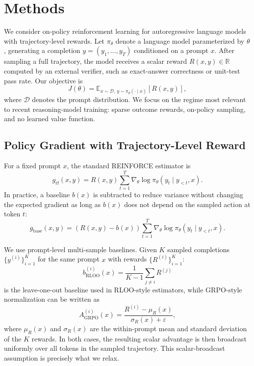 \section{Methods}\label{sec:methods}

We consider on-policy reinforcement learning for autoregressive language models with
trajectory-level rewards. Let $\pi_\theta$ denote a language model parameterized by
$\theta$, generating a completion $y=(y_1,\dots,y_T)$ conditioned on a prompt $x$. After
sampling a full trajectory, the model receives a scalar reward $R(x,y)\in\mathbb{R}$
computed by an external verifier, such as exact-answer correctness or unit-test pass
rate. Our objective is
\begin{equation}
J(\theta)=\mathbb{E}_{x \sim \mathcal{D},\, y \sim \pi_\theta(\cdot \mid x)}[R(x,y)],
\end{equation}
where $\mathcal{D}$ denotes the prompt distribution. We focus on the regime most
relevant to recent reasoning-model training: sparse outcome rewards, on-policy sampling,
and no learned value function.

\subsection{Policy Gradient with Trajectory-Level Reward}

For a fixed prompt $x$, the standard REINFORCE estimator is
\begin{equation}
g_{\mathrm{rf}}(x,y)=R(x,y)\sum_{t=1}^{T}\nabla_\theta \log \pi_\theta(y_t \mid y_{<t},x).
\end{equation}
In practice, a baseline $b(x)$ is subtracted to reduce variance without changing the
expected gradient as long as $b(x)$ does not depend on the sampled action at token $t$:
\begin{equation}
g_{\mathrm{base}}(x,y)=\left(R(x,y)-b(x)\right)\sum_{t=1}^{T}\nabla_\theta \log \pi_\theta(y_t \mid y_{<t},x).
\end{equation}

We use prompt-level multi-sample baselines. Given $K$ sampled completions
$\{y^{(i)}\}_{i=1}^{K}$ for the same prompt $x$ with rewards $\{R^{(i)}\}_{i=1}^{K}$:
\begin{equation}
b_{\mathrm{RLOO}}^{(i)}(x)=\frac{1}{K-1}\sum_{j \neq i}R^{(j)}
\end{equation}
is the leave-one-out baseline used in RLOO-style estimators, while GRPO-style
normalization can be written as
\begin{equation}
A_{\mathrm{GRPO}}^{(i)}(x)=\frac{R^{(i)}-\mu_R(x)}{\sigma_R(x)+\varepsilon},
\end{equation}
where $\mu_R(x)$ and $\sigma_R(x)$ are the within-prompt mean and standard deviation of
the $K$ rewards. In both cases, the resulting scalar advantage is then broadcast
uniformly over all tokens in the sampled trajectory. This scalar-broadcast assumption is
precisely what we relax.

